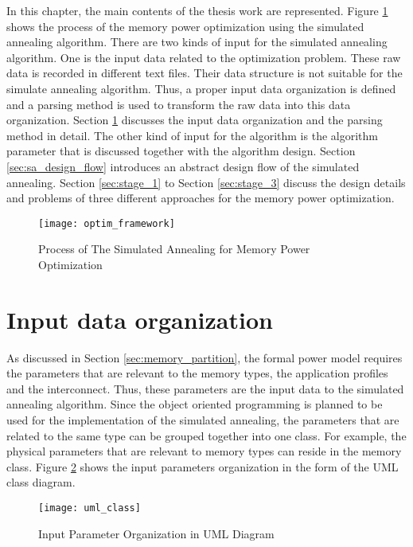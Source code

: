 \label{chap:main_work}
In this chapter, the main contents of the thesis work are represented.
Figure \ref{fig:framework} shows the process of the memory power
optimization using the simulated annealing algorithm.
There are two kinds of input for the simulated annealing algorithm.
One is the input data related to the optimization problem.
These raw data is recorded in different text files. Their data
structure is not suitable for the simulate annealing algorithm.
Thus, a proper input data organization is defined and a parsing
method is used to transform the raw data into this data organization.
Section \ref{sec:input_organ} discusses the input data organization
and the parsing method in detail.
The other kind of input for the algorithm is the algorithm parameter
that is discussed together with the algorithm design.
Section \ref{sec:sa_design_flow} introduces an abstract design flow of
the simulated annealing.
Section \ref{sec:stage_1} to Section \ref{sec:stage_3} discuss the
design details and problems of three different approaches for the memory
power optimization.
\begin{figure}[H]
	\begin{center}
		\texttt{[image: optim\_framework]}
		\caption{Process of The Simulated Annealing for Memory Power Optimization}
		\label{fig:framework}
	\end{center}
\end{figure}
	\section{Input data organization}
	\label{sec:input_organ}
	As discussed in Section \ref{sec:memory_partition}, the formal
	power model requires the parameters that are relevant to the
	memory types, the application profiles and the interconnect.
	Thus, these parameters are the input data to the simulated
	annealing algorithm.
	Since the object oriented programming is planned to be used for
	the implementation of the simulated annealing, the parameters
	that are related to the same type can be grouped together into
	one class. For example, the physical parameters that are
	relevant to memory types can reside in the memory class.
	Figure \ref{fig:uml} shows the input parameters
	organization in the form of the UML class diagram.
	\begin{figure}[htb]
		\begin{center}
			\texttt{[image: uml\_class]}
			\caption{Input Parameter Organization in UML Diagram}
			\label{fig:uml}
		\end{center}
	\end{figure}
	
